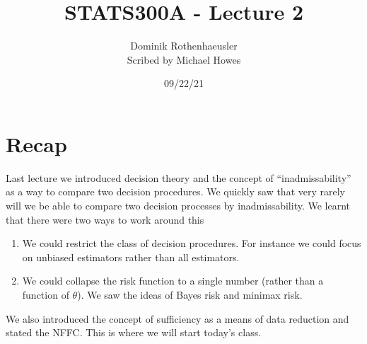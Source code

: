


\title{STATS300A - Lecture 2}
\author{Dominik Rothenhaeusler\\ Scribed by Michael Howes}
\date{09/22/21}

\pagestyle{fancy}
\fancyhf{}

\maketitle
\tableofcontents
\section{Recap}
Last lecture we introduced decision theory and the concept of ``inadmissability'' as a way to compare two decision procedures. We quickly saw that very rarely will we be able to compare two decision processes by inadmissability. We learnt that there were two ways to work around this
\begin{enumerate}
    \item We could restrict the class of decision procedures. For instance we could focus on unbiased estimators rather than all estimators. 
    \item We could collapse the risk function to a single number (rather than a function of $\theta$). We saw the ideas of Bayes risk and minimax risk.
\end{enumerate}
We also introduced the concept of sufficiency as a means of data reduction and stated the NFFC. This is where we will start today's class.



